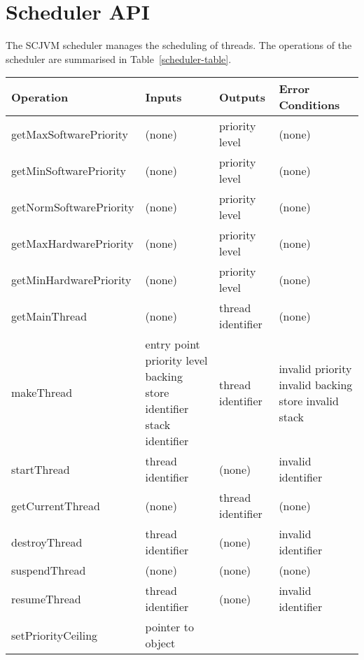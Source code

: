 \documentclass[a4paper,10pt]{report}
\begin{document}
\section{Scheduler API}
\label{scheduler-section}

The SCJVM scheduler manages the scheduling of threads. The operations of the
scheduler are summarised in Table~\ref{scheduler-table}.

\begin{table}[ht]
  \centering
  \footnotesize
  \begin{tabular}{|l|p{3cm}|p{2.2cm}|p{2.7cm}|}
    Operation & Inputs & Outputs & Error Conditions \\
    \hline
    getMaxSoftwarePriority &
      (none) &
      priority level &
      (none)
    \\getMinSoftwarePriority &
      (none) &
      priority level &
      (none)
    \\getNormSoftwarePriority &
      (none) &
      priority level &
      (none)
    \\getMaxHardwarePriority &
      (none) &
      priority level &
      (none)
    \\getMinHardwarePriority &
      (none) &
      priority level &
      (none)
    \\getMainThread &
      (none) &
      thread identifier &
      (none)
    \\makeThread &
      entry point \newline
      priority level \newline
      backing store identifier \newline
      stack identifier &
      thread identifier &
      invalid priority \newline
      invalid backing store \newline
      invalid stack
    \\startThread &
      thread identifier &
      (none) &
      invalid identifier
    \\getCurrentThread &
      (none) &
      thread identifier &
      (none)
    \\destroyThread &
      thread identifier &
      (none) &
      invalid identifier
    \\suspendThread &
      (none) &
      (none) &
      (none)
    \\resumeThread &
      thread identifier &
      (none) &
      invalid identifier
    \\setPriorityCeiling &
      pointer to object \newline

\end{tabular}
\end{table}
\end{document}
